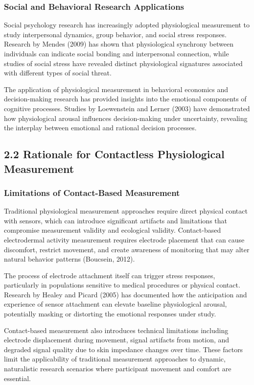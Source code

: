 \documentclass[12pt,a4paper]{article}
\begin{document}
\subsubsection{Social and Behavioral Research Applications}

Social psychology research has increasingly adopted physiological measurement to study interpersonal dynamics, group
behavior, and social stress responses. Research by Mendes (2009) has shown that physiological synchrony between
individuals can indicate social bonding and interpersonal connection, while studies of social stress have revealed
distinct physiological signatures associated with different types of social threat.

The application of physiological measurement in behavioral economics and decision-making research has provided insights
into the emotional components of cognitive processes. Studies by Loewenstein and Lerner (2003) have demonstrated how
physiological arousal influences decision-making under uncertainty, revealing the interplay between emotional and
rational decision processes.

\subsection{2.2 Rationale for Contactless Physiological Measurement}

\subsubsection{Limitations of Contact-Based Measurement}

Traditional physiological measurement approaches require direct physical contact with sensors, which can introduce
significant artifacts and limitations that compromise measurement validity and ecological validity. Contact-based
electrodermal activity measurement requires electrode placement that can cause discomfort, restrict movement, and create
awareness of monitoring that may alter natural behavior patterns (Boucsein, 2012).

The process of electrode attachment itself can trigger stress responses, particularly in populations sensitive to
medical procedures or physical contact. Research by Healey and Picard (2005) has documented how the anticipation and
experience of sensor attachment can elevate baseline physiological arousal, potentially masking or distorting the
emotional responses under study.

Contact-based measurement also introduces technical limitations including electrode displacement during movement, signal
artifacts from motion, and degraded signal quality due to skin impedance changes over time. These factors limit the
applicability of traditional measurement approaches to dynamic, naturalistic research scenarios where participant
movement and comfort are essential.
\end{document}
